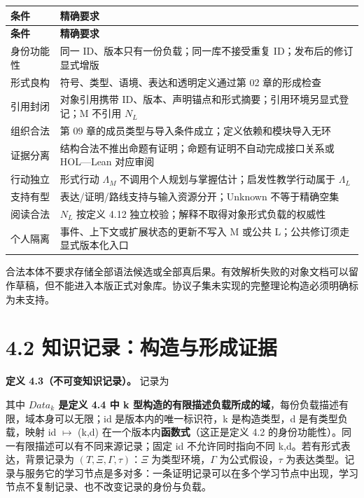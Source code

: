 \documentclass[UTF8,a4paper,zihao=-4,fontset=windows,openany]{ctexbook}
\newcommand{\mcsdisplay}[1]{%
  \par\addvspace{0.7em}%
  \sbox{\mcsmathbox}{\ensuremath{\displaystyle #1}}%
  \ifdim\wd\mcsmathbox>\linewidth
    \noindent\resizebox{\linewidth}{!}{\usebox{\mcsmathbox}}%
  \else
    \noindent\hspace*{\fill}\usebox{\mcsmathbox}\hspace*{\fill}%
  \fi
  \par\addvspace{0.7em}%
}
\def\ensuremath#1{#1}%
\def\mathrm#1{#1}%
\begin{document}
\begingroup\small\setlength{\tabcolsep}{4pt}
\begin{longtable}{>{\raggedright\arraybackslash}p{}>{\raggedright\arraybackslash}p{}}
\toprule
\textbf{条件} & \textbf{精确要求} \\
\midrule
\endfirsthead
\toprule
\textbf{条件} & \textbf{精确要求} \\
\midrule
\endhead
\bottomrule
\endfoot
\bottomrule
\endlastfoot
身份功能性 & 同一 ID、版本只有一份负载；同一库不接受重复 ID；发布后的修订显式增版 \\
形式良构 & 符号、类型、语境、表达和透明定义通过第 02 章的形成检查 \\
引用封闭 & 对象引用携带 ID、版本、声明锚点和形式摘要；引用环境另显式登记；M 不引用 \(N_L\) \\
组织合法 & 第 09 章的成员类型与导入条件成立；定义依赖和模块导入无环 \\
证据分离 & 结构合法不推出命题有证明；命题有证明不自动完成接口关系或 HOL—Lean 对应审阅 \\
行动独立 & 形式行动 \(\Lambda_M\) 不调用个人规划与掌握估计；启发性教学行动属于 \(\Lambda_L\) \\
支持有型 & 表达/证明/路线支持与输入资源分开；Unknown 不等于精确空集 \\
阅读合法 & \(N_L\) 按定义 4.12 独立校验；解释不取得对象形式负载的权威性 \\
个人隔离 & 事件、上下文或扩展状态的更新不写入 M 或公共 L；公共修订须走显式版本化入口 \\
\end{longtable}
\endgroup

合法本体不要求存储全部语法候选或全部真后果。有效解析失败的对象文档可以留作草稿，但不能进入本版正式对象库。协议子集未实现的完整理论构造必须明确标为未支持。

\section{4.2 知识记录：构造与形成证据}
\textbf{定义 4.3（不可变知识记录）。} 记录为


\mcsdisplay{r=(id,k,d),\qquad d\in Data_k.}
\noindent 其中 \textbf{\(\mathrm{Data}_k\) 是定义 4.4 中 k 型构造的有限描述负载所成的域}，每份负载描述有限，域本身可以无限；id 是版本内的唯一标识符，k 是构造类型，d 是有类型负载，映射 id \(\mapsto\) (k,d) 在一个版本内\textbf{函数式}（这正是定义 4.2 的身份功能性）。同一有限描述可以有不同来源记录；固定 id 不允许同时指向不同 k,d。若有形式表达，背景记录为 \((T,\Xi,\Gamma,\tau)\)：\(\Xi\) 为类型环境，\(\Gamma\) 为公式假设，\(\tau\) 为表达类型。记录与服务它的学习节点是多对多：一条证明记录可以在多个学习节点中出现，学习节点不复制记录、也不改变记录的身份与负载。
\end{document}
